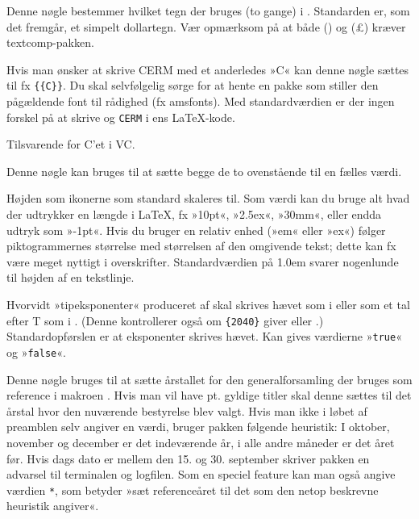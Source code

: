 \documentclass[a4paper,article,oneside,danish]{memoir}
\newcommand{\pakkenavn}[1]{\textsf{#1}}
\newcommand*{\descopt}[1]{%
  \medskip\noindent\llap{\color{option}#1\hspace*{8pt}}\ignorespaces}
\begin{document}
\descopt{dollar} Denne nøgle bestemmer hvilket tegn der bruges (to
gange) i . Standarden er, som det fremgår, et simpelt
dollartegn. Vær opmærksom på at både 
(\textdollaroldstyle) og  (\pounds) kræver
\pakkenavn{textcomp}-pakken.

\descopt{cermC} Hvis man ønsker at skrive CERM med et anderledes »C«
kan denne nøgle sættes til fx
\texttt{\{}\texttt{\{C\}\}}. Du skal
selvfølgelig sørge for at hente en pakke som stiller den pågældende
font til rådighed (fx \pakkenavn{amsfonts}). Med standardværdien er
der ingen forskel på at skrive  og \texttt{CERM} i ens
\LaTeX-kode.

\descopt{vcC} Tilsvarende for C'et i VC.

\descopt{C} Denne nøgle kan bruges til at sætte begge de to
ovenstående til en fælles værdi.

\descopt{ikonh} Højden som ikonerne som standard skaleres
til. Som værdi kan du bruge alt hvad der udtrykker en længde i \LaTeX,
fx »10pt«, »2.5ex«, »30mm«, eller endda udtryk som
»-1pt«. Hvis du bruger en relativ enhed (»em« eller
»ex«) følger piktogrammernes størrelse med størrelsen af den omgivende
tekst; dette kan fx være meget nyttigt i overskrifter. Standardværdien
på 1.0em svarer nogenlunde til højden af en tekstlinje.

\descopt{eksponent} Hvorvidt »tipeksponenter« produceret af
 skal skrives hævet som i {\KASS} eller
som et tal efter T som i
{}. (Denne kontrollerer
også om \texttt{\{2040\}} giver  eller
{}.) Standardopførslen er at
eksponenter skrives hævet. Kan gives værdierne »\texttt{true}« og
»\texttt{false}«.

\descopt{gf} Denne nøgle bruges til at sætte årstallet for den
generalforsamling der bruges som reference i makroen
. Hvis man vil have pt. gyldige titler skal denne sættes
til det årstal hvor den nuværende bestyrelse blev valgt. Hvis man ikke
i løbet af preamblen selv angiver en værdi, bruger pakken følgende
heuristik: I oktober, november og december er det indeværende år, i
alle andre måneder er det året før. Hvis dags dato er mellem den
15. og 30. september skriver pakken en advarsel til terminalen og
logfilen. Som en speciel feature kan man også angive værdien
\texttt{*}, som betyder »sæt referenceåret til det som den netop
beskrevne heuristik angiver«.
\end{document}
